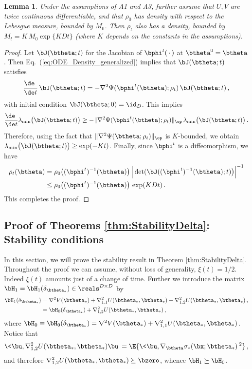 \documentclass[11pt]{article}
\newtheorem{lemma}{Lemma}
\begin{document}
%
\begin{lemma}\label{lemma:Density}
Under the assumptions of {\sf A1} and {\sf A3}, further assume that $U, V$ are twice continuous differentiable, and that $\rho_0$ has density
with respect to the Lebesgue measure, bounded by $M_0$. Then $\rho_t$ also has a density, 
bounded by $M_t = K\,M_0 \exp\{KD t\}$ (where $K$ depends on the constants in the assumptions).
\end{lemma}
%
\begin{proof}
Let $\bJ(\btheta;t)$ for the Jacobian of $\bphi^t(\,\cdot\, )$ at $\btheta^0=\btheta$. Then Eq.~(\ref{eq:ODE_Density_generalized}) implies
that $\bJ(\btheta;t)$ satisfies
%
\begin{align}
%
\frac{\de\phantom{t}}{\de t}\, \bJ(\btheta;t) = -\nabla^2\Psi(\bphi^t(\btheta);\rho_t)\,\bJ(\btheta;t)\,, 
%
\end{align}
%
with initial condition $\bJ(\btheta;0)=\id_D$. This implies 
%
\begin{align}
%
\frac{\de\phantom{t}}{\de t}\lambda_{\min}\big(\bJ(\btheta;t)\big)\ge -\|\nabla^2\Psi(\bphi^t(\btheta);\rho_t)\|_{\op}\,
\lambda_{\min}\big(
\bJ(\btheta;t)\big)\, .
%
\end{align}
%
Therefore, using the fact that  $\| \nabla^2\Psi(\btheta;\rho_t)\|_{\op}$ is $K$-bounded, we obtain $\lambda_{\min}\big(\bJ(\btheta;t)\big)\ge 
\exp(-Kt)$. Finally, since $\bphi^t$ is a diffeomorphism, we have
%
\begin{align}
%
\rho_{t}(\btheta) &= \rho_{0}\big((\bphi^{t})^{-1}(\btheta)\big)\,\Big|\det(\bJ((\bphi^{t})^{-1}(\btheta);t)\big)\Big|^{-1}\\
&\le \rho_{0}\big((\bphi^{t})^{-1}(\btheta)\big)\, \exp(K Dt)\,.
%
\end{align}
%
This completes the proof.
\end{proof}

\subsection{Proof of Theorems \ref{thm:StabilityDelta}: Stability conditions}
\label{sec:StabDelta}

In this section, we will prove the stability result in Theorem \ref{thm:StabilityDelta}. Throughout the proof we can assume, without loss of generality, $\xi(t) =1/2$. Indeed $\xi(t)$ amounts just of a change of time. Further we introduce the matrix $\bH_1=\bH_1(\delta_{\btheta_*})\in\reals^{D\times D}$ by
%
\begin{align}
%
\bH_1(\delta_{\btheta_*}) & = \nabla^2 V(\btheta_*) +\nabla^2_{1,1} U(\btheta_*,\btheta_*) +\nabla^2_{1,2} U(\btheta_*,\btheta_*)\, ,\\
& = \bH_0(\delta_{\btheta_*}) +\nabla^2_{1,2} U(\btheta_*,\btheta_*)\,,
%
\end{align}
where $\bH_0 \equiv \bH_0(\delta_{\btheta_*}) = \nabla^2 V(\btheta_*) +\nabla^2_{1,1} U(\btheta_*,\btheta_*)$. 
%
Notice that
%
\begin{align}
%
\<\bu,\nabla^2_{1,2} U(\btheta_*,\btheta_*)\bu\> = \E\{\<\bu,\nabla_{\btheta}\sigma_*(\bx;\btheta_*)\>^2\}\, ,
%
\end{align}
%
and therefore $\nabla^2_{1,2} U(\btheta_*,\btheta_*)\succeq \bzero$, whence $\bH_1\succeq\bH_0$.
\end{document}
